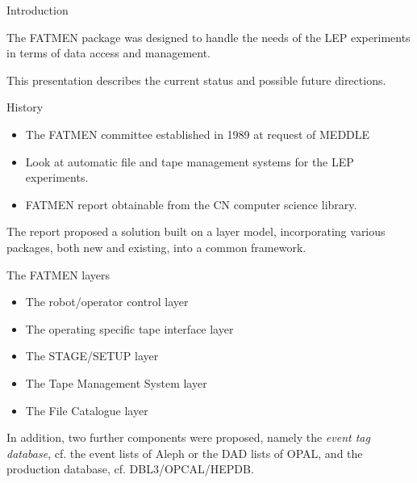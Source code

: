 \renewcommand{\SlideColours}[2]{%
  \renewcommand{\SlideFront}[1]{\color{#1}}%
    \slideframe%
    [\psset{fillcolor=#2,fillstyle=solid}]{scplain}%
}


\blackandwhite
\begin{slide}

\begin{center}Introduction\end{center}

The FATMEN package was designed to handle the needs
of the LEP experiments in terms of data access and
management. 

This presentation describes the current status
and possible future directions.

\end{slide}

\begin{slide}
\begin{center}History\end{center}

\begin{itemize}
\item
The FATMEN committee established in 1989 at request of MEDDLE
\item
Look at automatic file and tape
management systems for the LEP experiments. 
\item
FATMEN report obtainable from the CN computer science
library.
\end{itemize}

The report proposed a solution built on a layer model,
incorporating various packages, both new and existing,
into a common framework. 
\end{slide}

\begin{slide}

\begin{center}The FATMEN layers\end{center}

\begin{itemize}
\item
The robot/operator control layer
\item
The operating specific tape interface layer
\item
The STAGE/SETUP layer
\item
The Tape Management System layer
\item
The File Catalogue layer
\end{itemize}

In addition, two further components were proposed, namely
the {\it event tag database}, cf. the event lists of Aleph
or the DAD lists of OPAL, and the production database,
cf. DBL3/OPCAL/HEPDB.

\end{slide}


